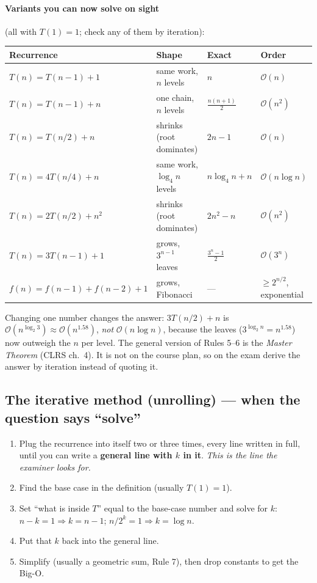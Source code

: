 \documentclass{fkt-notes}
\newcommand{\Oh}{\mathcal{O}}
\begin{document}
\paragraph{Variants you can now solve on sight} (all with $T(1)=1$; check any of them by iteration):
\begin{center}
\small
\begin{tabular}{@{}llll@{}}
\toprule
Recurrence & Shape & Exact & Order \\
\midrule
$T(n)=T(n-1)+1$ & same work, $n$ levels & $n$ & $\Oh(n)$ \\
$T(n)=T(n-1)+n$ & one chain, $n$ levels & $\frac{n(n+1)}2$ & $\Oh(n^2)$ \\
$T(n)=T(n/2)+n$ & shrinks (root dominates) & $2n-1$ & $\Oh(n)$ \\
$T(n)=4T(n/4)+n$ & same work, $\log_4 n$ levels & $n\log_4 n+n$ & $\Oh(n\log n)$ \\
$T(n)=2T(n/2)+n^2$ & shrinks (root dominates) & $2n^2-n$ & $\Oh(n^2)$ \\
$T(n)=3T(n-1)+1$ & grows, $3^{n-1}$ leaves & $\frac{3^n-1}2$ & $\Oh(3^n)$ \\
$f(n)=f(n-1)+f(n-2)+1$ & grows, Fibonacci & --- & $\ge 2^{n/2}$, exponential \\
\bottomrule
\end{tabular}
\end{center}

\begin{trap}
Changing one number changes the answer: $3T(n/2)+n$ is $\Oh(n^{\log_2 3})\approx\Oh(n^{1.58})$, \emph{not} $\Oh(n\log n)$, because the leaves ($3^{\log_2 n}=n^{1.58}$) now outweigh the $n$ per level. The general version of Rules 5--6 is the \emph{Master Theorem} (CLRS ch.~4). It is not on the course plan, so on the exam derive the answer by iteration instead of quoting it.
\end{trap}

\subsection{The iterative method (unrolling) --- when the question says ``solve''}
\begin{enumerate}[leftmargin=2em]
  \item Plug the recurrence into itself two or three times, every line written in full, until you can write a \textbf{general line with $k$ in it}. \emph{This is the line the examiner looks for.}
  \item Find the base case in the definition (usually $T(1)=1$).
  \item Set ``what is inside $T$'' equal to the base-case number and solve for $k$: $n-k=1\Rightarrow k=n-1$; $n/2^k=1\Rightarrow k=\log n$.
  \item Put that $k$ back into the general line.
  \item Simplify (usually a geometric sum, Rule 7), then drop constants to get the Big-O.
\end{enumerate}
\end{document}
